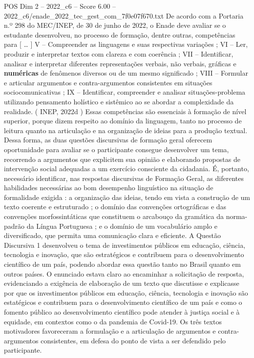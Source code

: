 \begin{textsample}{POS Dim 2 – 2022\_c6 – Score 6.00 – 2022\_c6/enade\_2022\_tec\_gest\_com\_7f0e07f670.txt}
De acordo com a Portaria n.º 298 do MEC/INEP, de 30 de junho de 2022, o Enade deve avaliar se o estudante desenvolveu, no processo de formação, dentre outras, competências para [ … ] V – Compreender as linguagens e suas respectivas variações ; VI – Ler, produzir e interpretar textos com clareza e com coerência ; VII – Identificar, analisar e interpretar diferentes representações verbais, não verbais, gráficas e \textbf{numéricas} de fenômenos diversos ou de um mesmo significado ; VIII – Formular e articular argumentos e contra-argumentos consistentes em situações sociocomunicativas ; IX – Identificar, compreender e analisar situações-problema utilizando pensamento holístico e sistêmico ao se abordar a complexidade da realidade. ( INEP, 2022d ) Essas competências são essenciais à formação de nível superior, porque dizem respeito ao domínio da linguagem, tanto no processo de leitura quanto na articulação e na organização de ideias para a produção textual.
Dessa forma, as duas questões discursivas de formação geral oferecem oportunidade para avaliar se o participante consegue desenvolver um tema, recorrendo a argumentos que explicitem sua opinião e elaborando propostas de intervenção social adequadas a um exercício consciente da cidadania.
É, portanto, necessário identificar, nas respostas discursivas de Formação Geral, as diferentes habilidades necessárias ao bom desempenho linguístico na situação de formalidade exigida : a organização das ideias, tendo em vista a construção de um texto coerente e estruturado ; o domínio das convenções ortográficas e das convenções morfossintáticas que constituem o arcabouço da gramática da norma-padrão da Língua Portuguesa ; e o domínio de um vocabulário amplo e diversificado, que permita uma comunicação clara e eficiente.
A Questão Discursiva 1 desenvolveu o tema de investimentos públicos em educação, ciência, tecnologia e inovação, que são estratégicos e contribuem para o desenvolvimento científico de um país, podendo abordar essa questão tanto no Brasil quanto em outros países.
O enunciado estava claro ao encaminhar a solicitação de resposta, evidenciando a exigência de elaboração de um texto que discutisse e explicasse por que os investimentos públicos em educação, ciência, tecnologia e inovação são estatégicos e contribuem para o desenvolvimento científico de um país e como o fomento público ao desenvolvimento científico pode atender à justiça social e à equidade, em contextos como o da pandemia de Covid-19.
Os três textos motivadores favoreceram a formulação e a articulação de argumentos e contra-argumentos consistentes, em defesa do ponto de vista a ser defendido pelo participante.

\end{textsample}
